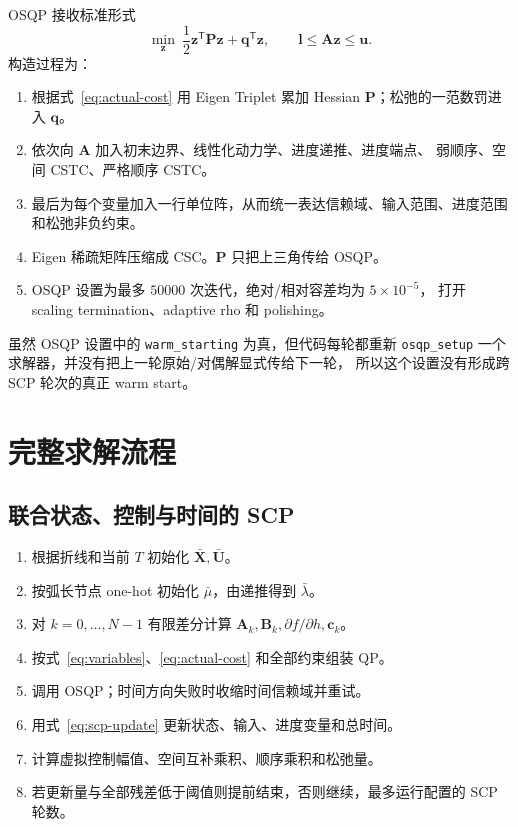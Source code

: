 \documentclass[UTF8,a4paper,11pt]{ctexart}
\newcommand{\code}[1]{\texttt{#1}}
\begin{document}
OSQP 接收标准形式
\begin{equation}
 \min_{\bm z}\ \frac12\bm z^\mathsf T\bm P\bm z+\bm q^\mathsf T\bm z,
 \qquad
 \bm l\leq\bm A\bm z\leq\bm u.
 \label{eq:osqp}
\end{equation}
构造过程为：
\begin{enumerate}
  \item 根据式~\eqref{eq:actual-cost} 用 Eigen Triplet 累加 Hessian
  $\bm P$；松弛的一范数罚进入 $\bm q$。
  \item 依次向 $\bm A$ 加入初末边界、线性化动力学、进度递推、进度端点、
  弱顺序、空间 CSTC、严格顺序 CSTC。
  \item 最后为每个变量加入一行单位阵，从而统一表达信赖域、输入范围、进度范围
  和松弛非负约束。
  \item Eigen 稀疏矩阵压缩成 CSC。$\bm P$ 只把上三角传给 OSQP。
  \item OSQP 设置为最多 $50000$ 次迭代，绝对/相对容差均为 $5\times10^{-5}$，
  打开 scaling termination、adaptive rho 和 polishing。
\end{enumerate}

虽然 OSQP 设置中的 \code{warm\_starting} 为真，但代码每轮都重新
\code{osqp\_setup} 一个求解器，并没有把上一轮原始/对偶解显式传给下一轮，
所以这个设置没有形成跨 SCP 轮次的真正 warm start。

\section{完整求解流程}

\subsection{联合状态、控制与时间的 SCP}

\begin{enumerate}
  \item 根据折线和当前 $T$ 初始化 $\bar{\bm X},\bar{\bm U}$。
  \item 按弧长节点 one-hot 初始化 $\bar\mu$，由递推得到 $\bar\lambda$。
  \item 对 $k=0,\ldots,N-1$ 有限差分计算
  $\bm A_k,\bm B_k,\partial f/\partial h,\bm c_k$。
  \item 按式~\eqref{eq:variables}、\eqref{eq:actual-cost} 和全部约束组装 QP。
  \item 调用 OSQP；时间方向失败时收缩时间信赖域并重试。
  \item 用式~\eqref{eq:scp-update} 更新状态、输入、进度变量和总时间。
  \item 计算虚拟控制幅值、空间互补乘积、顺序乘积和松弛量。
  \item 若更新量与全部残差低于阈值则提前结束，否则继续，最多运行配置的
  SCP 轮数。
\end{enumerate}
\end{document}
